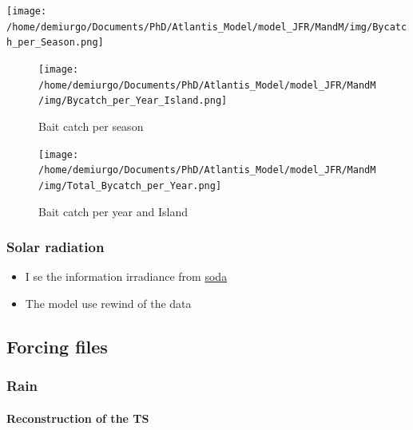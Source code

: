 \documentclass[11pt]{article}
\begin{document}
\begin{itemize}
\begin{itemize}
 \texttt{[image: /home/demiurgo/Documents/PhD/Atlantis\_Model/model\_JFR/MandM/img/Bycatch\_per\_Season.png]}
 \begin{figure}[htb]
 \centering
 \texttt{[image: /home/demiurgo/Documents/PhD/Atlantis\_Model/model\_JFR/MandM/img/Bycatch\_per\_Year\_Island.png]}
 \caption{Bait catch per season}
 \end{figure}
 \begin{figure}[htb]
 \centering
 \texttt{[image: /home/demiurgo/Documents/PhD/Atlantis\_Model/model\_JFR/MandM/img/Total\_Bycatch\_per\_Year.png]}
 \caption{Bait catch per year and Island}
 \end{figure}
\end{itemize} %
\end{itemize} %
\subsubsection*{Solar radiation}
\label{sec-5-2-3}

\begin{itemize}
\item I se the information irradiance from \href{http://www.soda-pro.com/web-services/radiation/nasa-sse}{soda}
\item The model use rewind of the data
\end{itemize}
\subsection*{Forcing files}
\label{sec-5-3}
\subsubsection*{Rain}
\label{sec-5-3-1}
\paragraph*{Reconstruction of the TS}
\label{sec-5-3-1-1}
\end{document}
